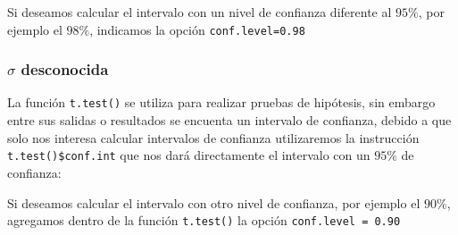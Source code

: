 \documentclass[letterpaper,]{book}
\newenvironment{Shaded}{\begin{snugshade}}{\end{snugshade}}
\newcommand{\CommentTok}[1]{\textcolor[rgb]{0.56,0.35,0.01}{\textit{#1}}}
\newcommand{\DataTypeTok}[1]{\textcolor[rgb]{0.13,0.29,0.53}{#1}}
\newcommand{\FloatTok}[1]{\textcolor[rgb]{0.00,0.00,0.81}{#1}}
\newcommand{\KeywordTok}[1]{\textcolor[rgb]{0.13,0.29,0.53}{\textbf{#1}}}
\newcommand{\NormalTok}[1]{#1}
\newcommand{\OperatorTok}[1]{\textcolor[rgb]{0.81,0.36,0.00}{\textbf{#1}}}
\begin{document}
Si deseamos calcular el intervalo con un nivel de confianza diferente al \(95\%\), por ejemplo el \(98\%\), indicamos la opción \texttt{conf.level=0.98}

\begin{Shaded}
\end{Shaded}

\hypertarget{musd}{%
\subsubsection{\texorpdfstring{\(\sigma\) desconocida}{\textbackslash{}sigma desconocida}}\label{musd}}

La función \texttt{t.test()} se utiliza para realizar pruebas de hipótesis, sin embargo entre sus salidas o resultados se encuenta un intervalo de confianza, debido a que solo nos interesa calcular intervalos de confianza utilizaremos la instrucción \texttt{t.test()\$conf.int} que nos dará directamente el intervalo con un \(95\%\) de confianza:

\begin{Shaded}
\end{Shaded}

Si deseamos calcular el intervalo con otro nivel de confianza, por ejemplo el \(90\%\), agregamos dentro de la función \texttt{t.test()} la opción \texttt{conf.level\ =\ 0.90}

\begin{Shaded}
\end{Shaded}
\end{document}
